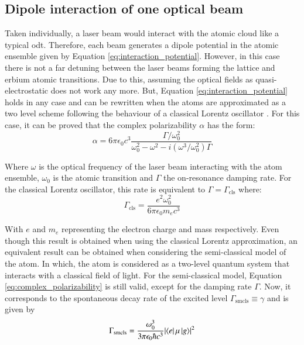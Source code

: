 \subsection{Dipole interaction of one optical beam}

Taken individually, a laser beam would interact with the atomic cloud like a typical \acf{odt}. Therefore, each beam generates a dipole potential in the atomic ensemble given by Equation \eqref{eq:interaction_potential}. However, in this case there is not a far detuning between the laser beams forming the lattice and erbium atomic transitions. Due to this, assuming the optical fields as quasi-electrostatic does not work any more. But, Equation \eqref{eq:interaction_potential} holds in any case and can be rewritten when the atoms are approximated as a two level scheme following the behaviour of a classical Lorentz oscillator \cite{Grimm2000}. For this case, it can be proved that the complex polarizability $\alpha$ has the form:
\begin{equation}\label{eq:complex_polarizability}
	\alpha = 6 \pi \epsilon_0 c^3 \frac{\Gamma/\omega_0^2}{\omega_0^2 -\omega^2 -i(\omega^3/\omega_0^2)\Gamma} 
\end{equation} 

Where $\omega$ is the optical frequency of the laser beam interacting with the atom ensemble, $\omega_0$ is the atomic transition and $\Gamma$ the on-resonance damping rate. For the classical Lorentz oscillator, this rate is equivalent to $\Gamma = \Gamma_\text{cls}$ where:
\begin{equation}\label{eq:classical_damping_rate}
	\Gamma_\text{cls} = \frac{e^2 \omega_0^2}{6\pi\epsilon_0m_ec^3}
\end{equation}

With $e$ and $m_e$ representing the electron charge and mass respectively. Even though this result is obtained when using the classical Lorentz approximation, an equivalent result can be obtained when considering the semi-classical model of the atom. In which, the atom is considered as a two-level quantum system that interacts with a classical field of light. For the semi-classical model, Equation \eqref{eq:complex_polarizability} is still valid, except for the damping rate $\Gamma$. Now, it corresponds to the spontaneous decay rate of the excited level $\Gamma_\text{smcls} \equiv \gamma$ and is given by
\begin{equation}\label{eq:semiclassical_damping_rate}
	\Gamma_\text{smcls} = \frac{\omega_0^3}{3\pi\epsilon_0 \hbar c^3} \mathopen|\bra{e}\mu\ket{g}\mathclose|^2
\end{equation}

